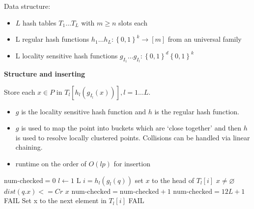\documentclass[../notes.tex]{subfiles}
\begin{document}
Data structure:


        \begin{itemize}
            \item $ L $ hash tables $ T_1 \ldots T_L $ with $ m \ge  n $ slots each
            \item L regular hash functions $ h_1 \ldots h_L : \left\{ 0, 1 \right\}^k \to \left[ m \right] $ from an universal family
            \item  L locality sensitive hash functions $ g_{I_1} \ldots g_{I_l} : \left\{ 0, 1 \right\} ^d \left\{ 0, 1 \right\} ^k$
\end{itemize}


\textbf{Structure and inserting}

Store each $ x \in P $ in $ T_l[h_l(g_{I_l}(x))], l = 1 \ldots L $.
\begin{itemize}
    \item $ g $ is the locality sensitive hash function and $ h $ is the regular hash function.
    \item $ g $ is used to map the point into buckets which are `close together' and then $ h $ is used to resolve locally clustered points. Collisions can be handled via linear chaining.
    \item runtime on the order of $ O(lp) $ for insertion
\end{itemize}

\begin{codebox}
\li $\text{num-checked} = 0$
\li \For $ l \gets 1 $ \To L \Do
\li     $ i = h_l(g_l(q)) $
\li     set $ x $ to the head of $ T_l[i] $
\li     \While $ x \neq \varnothing $  \Do
\li         \If $ dist(q.x) <= Cr $ \Then 
\li             \Return $ x $ \End
\li         $\text{num-checked} = \text{num-checked} + 1$
\li         \If $ \text{num-checked} = 12L + 1$  \Then
\li             \Return FAIL \End
\li         \Else
\li             Set x to the next element in $ T_l[i] $ \End \End \End
\li \Return FAIL
\end{codebox}
\end{document}
